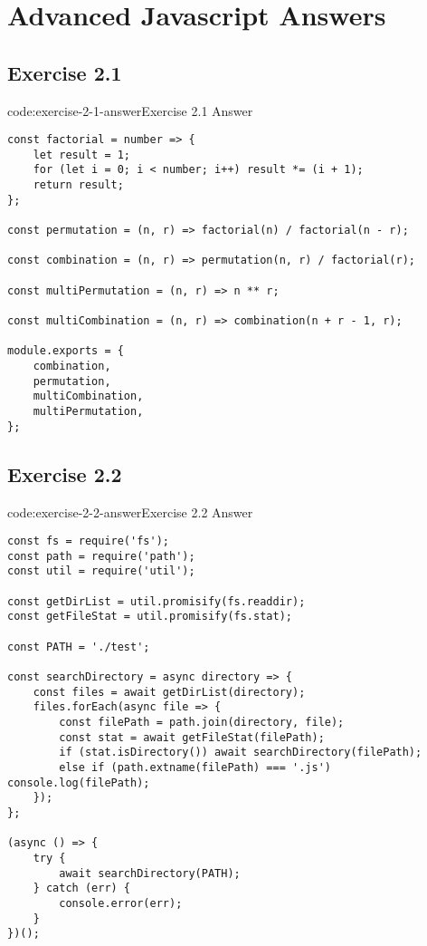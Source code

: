 \section{Advanced Javascript Answers}\label{sect:advanced-javascript-answers}

\subsection*{Exercise 2.1}

\begin{codeenv}{code:exercise-2-1-answer}{Exercise 2.1 Answer}\begin{verbatim}
const factorial = number => {
    let result = 1;
    for (let i = 0; i < number; i++) result *= (i + 1);
    return result;
};

const permutation = (n, r) => factorial(n) / factorial(n - r);

const combination = (n, r) => permutation(n, r) / factorial(r);

const multiPermutation = (n, r) => n ** r;

const multiCombination = (n, r) => combination(n + r - 1, r);

module.exports = {
    combination,
    permutation,
    multiCombination,
    multiPermutation,
};
\end{verbatim}
\end{codeenv}

\subsection*{Exercise 2.2}

\begin{codeenv}{code:exercise-2-2-answer}{Exercise 2.2 Answer}\begin{verbatim}
const fs = require('fs');
const path = require('path');
const util = require('util');

const getDirList = util.promisify(fs.readdir);
const getFileStat = util.promisify(fs.stat);

const PATH = './test';

const searchDirectory = async directory => {
    const files = await getDirList(directory);
    files.forEach(async file => {
        const filePath = path.join(directory, file);
        const stat = await getFileStat(filePath);
        if (stat.isDirectory()) await searchDirectory(filePath);
        else if (path.extname(filePath) === '.js') console.log(filePath);
    });
};

(async () => {
    try {
        await searchDirectory(PATH);
    } catch (err) {
        console.error(err);
    }
})();
\end{verbatim}
\end{codeenv}
